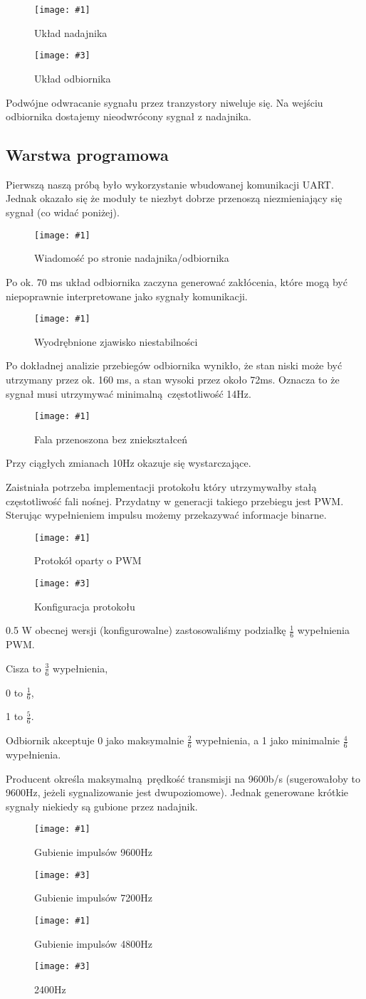\documentclass[12pt]{article}
\let\tempone\itemize
\let\temptwo\enditemize
\renewenvironment{itemize}{\tempone\setlength{\itemsep}{0cm}}{\temptwo}
\newcommand{\imgcustomsize}[3]{
	\begin{figure}[H]
		\centering
		\texttt{[image: \#1]}
		\caption{#2}
	\end{figure}
}
\newcommand{\img}[2]{\imgcustomsize{#1}{#2}{0.8}}
\newcommand{\imgsidebyside}[4]{
	\begin{figure}[H]
		\centering
		\begin{minipage}{.45\textwidth}
			\centering
			\texttt{[image: \#1]}
			\caption{#2}
		\end{minipage}%
		\hfill
		\begin{minipage}{.45\textwidth}
			\centering
			\texttt{[image: \#3]}
			\caption{#4}
		\end{minipage}
	\end{figure}
}
\begin{document}
			\imgsidebyside{sch/tx}{Układ nadajnika}{sch/rx}{Układ odbiornika}

			Podwójne odwracanie sygnału przez tranzystory niweluje się. Na wejściu odbiornika dostajemy nieodwrócony sygnał z nadajnika.

		\subsection{Warstwa programowa}
			Pierwszą naszą próbą było wykorzystanie wbudowanej komunikacji UART. Jednak okazało się że moduły te niezbyt dobrze przenoszą niezmieniający się sygnał (co widać poniżej).

			\img{fail1}{Wiadomość po stronie nadajnika/odbiornika}
			Po ok. 70 ms układ odbiornika zaczyna generować zakłócenia, które mogą być niepoprawnie interpretowane jako sygnały komunikacji.

			\img{fail2}{Wyodrębnione zjawisko niestabilności}
			Po dokładnej analizie przebiegów odbiornika wynikło, że stan niski może być utrzymany przez ok. 160 ms, a stan wysoki przez około 72ms. Oznacza to że sygnał musi utrzymywać minimalną częstotliwość 14Hz.

			\img{fail3_good}{Fala przenoszona bez zniekształceń}
			Przy ciągłych zmianach 10Hz okazuje się wystarczające.

			Zaistniała potrzeba implementacji protokołu który utrzymywałby stałą częstotliwość fali nośnej. Przydatny w generacji takiego przebiegu jest PWM. Sterując wypełnieniem impulsu możemy przekazywać informacje binarne.
			\imgsidebyside{pgm/proto}{Protokół oparty o PWM}{pgm/proto_conf}{Konfiguracja protokołu}{0.5}
			W obecnej wersji (konfigurowalne) zastosowaliśmy podziałkę $\frac{1}{6}$ wypełnienia PWM.
			\begin{itemize}
				\item Cisza to  $\frac{3}{6}$ wypełnienia,
				\item 0 to  $\frac{1}{6}$,
				\item 1 to  $\frac{5}{6}$.
			\end{itemize}

			Odbiornik akceptuje 0 jako maksymalnie $\frac{2}{6}$ wypełnienia, a 1 jako minimalnie $\frac{4}{6}$ wypełnienia.

			Producent określa maksymalną prędkość transmisji na 9600b/s (sugerowałoby to 9600Hz, jeżeli sygnalizowanie jest dwupoziomowe). Jednak generowane krótkie sygnały niekiedy są gubione przez nadajnik.

			\imgsidebyside{bauds/9600}{Gubienie impulsów 9600Hz}{bauds/7200_2}{Gubienie impulsów 7200Hz}
			\imgsidebyside{bauds/4800_2}{Gubienie impulsów 4800Hz}{bauds/2400_2}{2400Hz}
\end{document}
